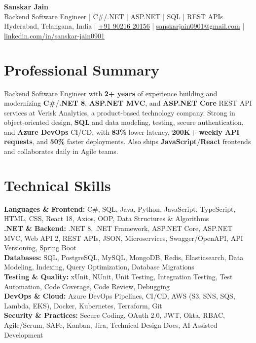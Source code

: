 \documentclass[a4paper,10pt]{article}
\begin{document}
\begin{center}
    {\LARGE \textbf{Sanskar Jain}} \\
    \vspace{2pt}
    Backend Software Engineer \;|\; C\#/.NET \;|\; ASP.NET \;|\; SQL \;|\; REST APIs \\
    \vspace{2pt}
    Hyderabad, Telangana, India \;|\;
    \href{tel:+919021620156}{+91 90216 20156} \;|\;
    \href{mailto:sanskarjain0901@gmail.com}{sanskarjain0901@gmail.com} \;|\;
    \href{https://www.linkedin.com/in/sanskar-jain0901/}{linkedin.com/in/sanskar-jain0901}
\end{center}

\section*{Professional Summary}
Backend Software Engineer with \textbf{2+ years} of experience building and modernizing \textbf{C\#}/\textbf{.NET 8}, \textbf{ASP.NET MVC}, and \textbf{ASP.NET Core} REST API services at Verisk Analytics, a product-based technology company.
Strong in object-oriented design, \textbf{SQL} and data modeling, testing, secure authentication, and \textbf{Azure DevOps} CI/CD, with \textbf{83\%} lower latency, \textbf{200K+ weekly API requests}, and \textbf{50\%} faster deployments.
Also ships \textbf{JavaScript}/\textbf{React} frontends and collaborates daily in Agile teams.

\section*{Technical Skills}
\begin{sloppypar}
\noindent
\textbf{Languages \& Frontend:} C\#, SQL, Java, Python, JavaScript, TypeScript, HTML, CSS, React 18, Axios, OOP, Data Structures \& Algorithms \\
\textbf{.NET \& Backend:} .NET 8, .NET Framework, ASP.NET Core, ASP.NET MVC, Web API 2, REST APIs, JSON, Microservices, Swagger/OpenAPI, API Versioning, Spring Boot \\
\textbf{Databases:} SQL, PostgreSQL, MySQL, MongoDB, Redis, Elasticsearch, Data Modeling, Indexing, Query Optimization, Database Migrations \\
\textbf{Testing \& Quality:} xUnit, NUnit, Unit Testing, Integration Testing, Test Automation, Code Coverage, Code Review, Debugging \\
\textbf{DevOps \& Cloud:} Azure DevOps Pipelines, CI/CD, AWS (S3, SNS, SQS, Lambda, EKS), Docker, Kubernetes, Terraform, Git \\
\textbf{Security \& Practices:} Secure Coding, OAuth 2.0, JWT, Okta, RBAC, Agile/Scrum, SAFe, Kanban, Jira, Technical Design Docs, AI-Assisted Development
\end{sloppypar}
\end{document}
